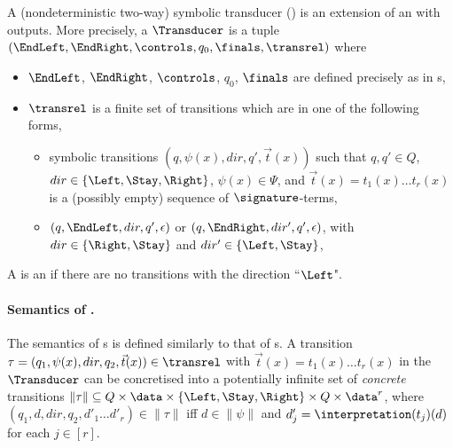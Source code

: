 \begin{definition}
    A (nondeterministic two-way) symbolic transducer (\SST) is an extension of an \SSA{} with outputs. More precisely, a \SST{} $\Transducer$ is a tuple $(\EndLeft, \EndRight, \controls, q_0, \finals, \transrel)$ where  
\begin{itemize}
%
\item $\EndLeft$, $\EndRight$, $\controls$, $q_0$, $\finals$ are defined precisely as in \SSA{}s, 
%
\item $\transrel$ is a finite set of  transitions which are in one of the following forms,
\begin{itemize}
\item  symbolic transitions $(q, \psi(x), dir, q', \vec{t}(x))$ such that $q, q' \in Q$, $dir \in \{\Left, \Stay, \Right\}$, $\psi(x) \in \Psi$, and
$\vec{t}(x) = t_1(x) \ldots t_r(x)$ is a (possibly empty) sequence of $\signature$-terms, 
\item   $(q, \EndLeft, dir, q', \epsilon)$ or $(q, \EndRight, dir', q', \epsilon)$, with $dir \in \{\Right, \Stay\}$ and $dir' \in \{\Left, \Stay\}$,
\end{itemize}
\end{itemize}
A \SST{} is an \ST{} if there are no transitions with the direction ``$\Left$". 
\end{definition}

\paragraph{Semantics of \SST{}.}
The semantics of \SST{}s is defined similarly to that of \SSA{}s. 
A transition $\tau=(q_1,\psi(x), dir, q_2, \vec{t}(x)) \in \transrel$ with $\vec{t}(x) = t_1(x) \ldots t_r(x)$ in the \SST{} $\Transducer$ can be concretised
into a potentially infinite set of \emph{concrete} transitions $\|\tau\| \subseteq Q \times \data \times \{\Left, \Stay, \Right\} \times Q \times \data^r$, where $(q_1, d, dir, q_2, d'_1\ldots d'_r)  \in \|\tau\|$ iff $d \in \|\psi\|$ and $d'_j = \interpretation(t_j)(d)$ for each $j \in [r]$.


